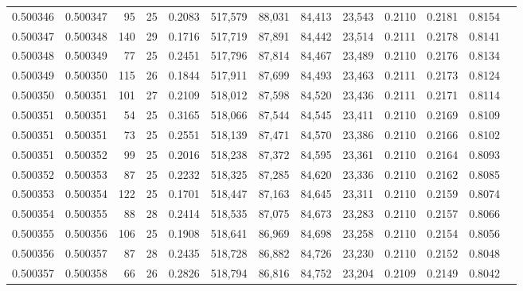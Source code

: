 \begin{tabular}{rrrrrrrrrrrrr}
0.500346 & 0.500347 &  95 &  25 &                                     0.2083 & 517,579 &  88,031 &  84,413 &  23,543 & 0.2110 & 0.2181 & 0.8154 \\
0.500347 & 0.500348 & 140 &  29 &                                     0.1716 & 517,719 &  87,891 &  84,442 &  23,514 & 0.2111 & 0.2178 & 0.8141 \\
0.500348 & 0.500349 &  77 &  25 &                                     0.2451 & 517,796 &  87,814 &  84,467 &  23,489 & 0.2110 & 0.2176 & 0.8134 \\
0.500349 & 0.500350 & 115 &  26 &                                     0.1844 & 517,911 &  87,699 &  84,493 &  23,463 & 0.2111 & 0.2173 & 0.8124 \\
0.500350 & 0.500351 & 101 &  27 &                                     0.2109 & 518,012 &  87,598 &  84,520 &  23,436 & 0.2111 & 0.2171 & 0.8114 \\
0.500351 & 0.500351 &  54 &  25 &                                     0.3165 & 518,066 &  87,544 &  84,545 &  23,411 & 0.2110 & 0.2169 & 0.8109 \\
0.500351 & 0.500351 &  73 &  25 &                                     0.2551 & 518,139 &  87,471 &  84,570 &  23,386 & 0.2110 & 0.2166 & 0.8102 \\
0.500351 & 0.500352 &  99 &  25 &                                     0.2016 & 518,238 &  87,372 &  84,595 &  23,361 & 0.2110 & 0.2164 & 0.8093 \\
0.500352 & 0.500353 &  87 &  25 &                                     0.2232 & 518,325 &  87,285 &  84,620 &  23,336 & 0.2110 & 0.2162 & 0.8085 \\
0.500353 & 0.500354 & 122 &  25 &                                     0.1701 & 518,447 &  87,163 &  84,645 &  23,311 & 0.2110 & 0.2159 & 0.8074 \\
0.500354 & 0.500355 &  88 &  28 &                                     0.2414 & 518,535 &  87,075 &  84,673 &  23,283 & 0.2110 & 0.2157 & 0.8066 \\
0.500355 & 0.500356 & 106 &  25 &                                     0.1908 & 518,641 &  86,969 &  84,698 &  23,258 & 0.2110 & 0.2154 & 0.8056 \\
0.500356 & 0.500357 &  87 &  28 &                                     0.2435 & 518,728 &  86,882 &  84,726 &  23,230 & 0.2110 & 0.2152 & 0.8048 \\
0.500357 & 0.500358 &  66 &  26 &                                     0.2826 & 518,794 &  86,816 &  84,752 &  23,204 & 0.2109 & 0.2149 & 0.8042 \\

\end{tabular}
